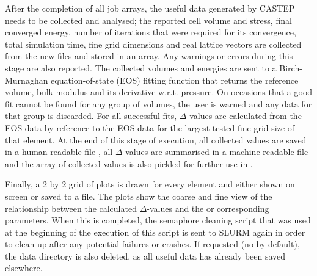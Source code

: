 After the completion of all job arrays, the useful data generated by CASTEP needs to be collected and analysed; the reported cell volume and stress, final converged energy, number of iterations that were required for its convergence, total simulation time, fine grid dimensions and real lattice vectors are collected from the new  files and stored in an array. Any warnings or errors during this stage are also reported. The collected volumes and energies are sent to a Birch-Murnaghan equation-of-state (EOS) fitting function that returns the reference volume, bulk modulus and its derivative w.r.t. pressure. On occasions that a good fit cannot be found for any group of volumes, the user is warned and any data for that group is discarded. For all successful fits, $\Delta$-values \cite{delta} are calculated from the EOS data by reference to the EOS data for the largest tested fine grid size of that element. At the end of this stage of execution, all collected values are saved in a human-readable file , all $\Delta$-values are summarised in a machine-readable file  and the array of collected values is also pickled for further use in .

Finally, a 2 by 2 grid of plots is drawn for every element and either shown on screen or saved to a  file. The plots show the coarse and fine view of the relationship between the calculated $\Delta$-values and the  or corresponding  parameters. When this is completed, the semaphore cleaning script that was used at the beginning of the execution of this script is sent to SLURM again in order to clean up after any potential failures or crashes. If requested (no by default), the  data directory is also deleted, as all useful data has already been saved elsewhere.

